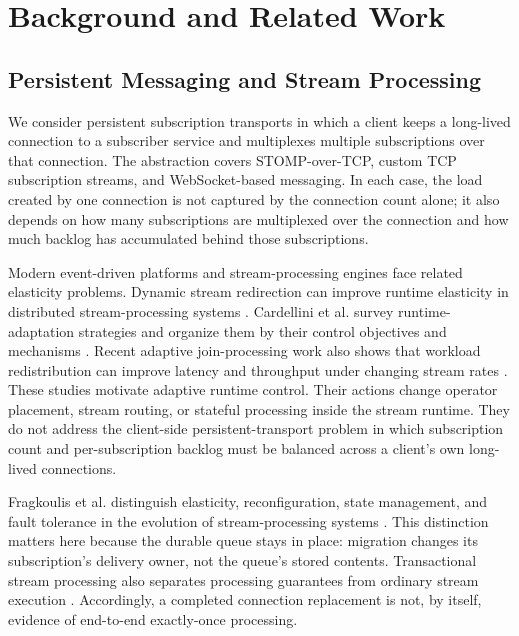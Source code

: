 \section{Background and Related Work}

\subsection{Persistent Messaging and Stream Processing}

We consider persistent subscription transports in which a client keeps a
long-lived connection to a subscriber service and multiplexes multiple
subscriptions over that connection. The abstraction covers STOMP-over-TCP,
custom TCP subscription streams, and WebSocket-based messaging. In each case,
the load created by one connection is not captured by the connection count
alone; it also depends on how many subscriptions are multiplexed over the
connection and how much backlog has accumulated behind those subscriptions.

Modern event-driven platforms and stream-processing engines face related
elasticity problems. Dynamic stream redirection can improve runtime elasticity
in distributed stream-processing systems \cite{Liu2020DrStream}. Cardellini
et al. survey runtime-adaptation strategies and organize them by their control
objectives and mechanisms \cite{Cardellini2022DSPAdaptation}. Recent adaptive
join-processing work also shows that workload redistribution can improve
latency and throughput under changing stream rates \cite{Sun2024AjStream}.
These studies motivate adaptive runtime control. Their actions change
operator placement, stream routing, or stateful processing inside the stream
runtime. They do not address the client-side persistent-transport problem in
which subscription count and per-subscription backlog must be balanced across a
client's own long-lived connections.

Fragkoulis et al. distinguish elasticity, reconfiguration, state management,
and fault tolerance in the evolution of stream-processing systems
\cite{Fragkoulis2024StreamEvolution}. This distinction matters here because
the durable queue stays in place: migration changes its subscription's delivery
owner, not the queue's stored contents. Transactional stream processing also
separates processing guarantees from ordinary stream execution
\cite{Zhang2024TransactionalStreams}. Accordingly, a completed connection
replacement is not, by itself, evidence of end-to-end exactly-once processing.

